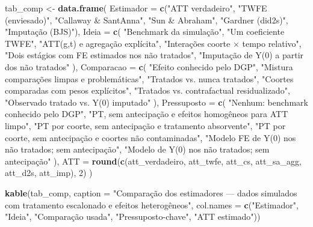 \documentclass[
]{article}
\newenvironment{Shaded}{\begin{snugshade}}{\end{snugshade}}
\newcommand{\AttributeTok}[1]{\textcolor[rgb]{0.13,0.29,0.53}{#1}}
\newcommand{\DecValTok}[1]{\textcolor[rgb]{0.00,0.00,0.81}{#1}}
\newcommand{\FunctionTok}[1]{\textcolor[rgb]{0.13,0.29,0.53}{\textbf{#1}}}
\newcommand{\NormalTok}[1]{#1}
\newcommand{\OtherTok}[1]{\textcolor[rgb]{0.56,0.35,0.01}{#1}}
\newcommand{\StringTok}[1]{\textcolor[rgb]{0.31,0.60,0.02}{#1}}
\begin{document}
\begin{Shaded}
\begin{Highlighting}[]
\NormalTok{tab\_comp }\OtherTok{\textless{}{-}} \FunctionTok{data.frame}\NormalTok{(}
  \AttributeTok{Estimador =} \FunctionTok{c}\NormalTok{(}\StringTok{"ATT verdadeiro"}\NormalTok{, }\StringTok{"TWFE (enviesado)"}\NormalTok{, }\StringTok{"Callaway \& Sant\textquotesingle{}Anna"}\NormalTok{,}
                \StringTok{"Sun \& Abraham"}\NormalTok{, }\StringTok{"Gardner (did2s)"}\NormalTok{, }\StringTok{"Imputação (BJS)"}\NormalTok{),}
  \AttributeTok{Ideia =} \FunctionTok{c}\NormalTok{(}
    \StringTok{"Benchmark da simulação"}\NormalTok{,}
    \StringTok{"Um coeficiente TWFE"}\NormalTok{,}
    \StringTok{"ATT(g,t) e agregação explícita"}\NormalTok{,}
    \StringTok{"Interações coorte × tempo relativo"}\NormalTok{,}
    \StringTok{"Dois estágios com FE estimados nos não tratados"}\NormalTok{,}
    \StringTok{"Imputação de Y(0) a partir dos não tratados"}
\NormalTok{  ),}
  \AttributeTok{Comparacao =} \FunctionTok{c}\NormalTok{(}
    \StringTok{"Efeito conhecido pelo DGP"}\NormalTok{,}
    \StringTok{"Mistura comparações limpas e problemáticas"}\NormalTok{,}
    \StringTok{"Tratados vs. nunca tratados"}\NormalTok{,}
    \StringTok{"Coortes comparadas com pesos explícitos"}\NormalTok{,}
    \StringTok{"Tratados vs. contrafactual residualizado"}\NormalTok{,}
    \StringTok{"Observado tratado vs. Y(0) imputado"}
\NormalTok{  ),}
  \AttributeTok{Pressuposto =} \FunctionTok{c}\NormalTok{(}
    \StringTok{"Nenhum: benchmark conhecido pelo DGP"}\NormalTok{,}
    \StringTok{"PT, sem antecipação e efeitos homogêneos para ATT limpo"}\NormalTok{,}
    \StringTok{"PT por coorte, sem antecipação e tratamento absorvente"}\NormalTok{,}
    \StringTok{"PT por coorte, sem antecipação e coortes não contaminadas"}\NormalTok{,}
    \StringTok{"Modelo FE de Y(0) nos não tratados; sem antecipação"}\NormalTok{,}
    \StringTok{"Modelo de Y(0) nos não tratados; sem antecipação"}
\NormalTok{  ),}
  \AttributeTok{ATT =} \FunctionTok{round}\NormalTok{(}\FunctionTok{c}\NormalTok{(att\_verdadeiro, att\_twfe, att\_cs, att\_sa\_agg, att\_d2s, att\_imp), }\DecValTok{2}\NormalTok{)}
\NormalTok{)}

\FunctionTok{kable}\NormalTok{(tab\_comp, }\AttributeTok{caption =} \StringTok{"Comparação dos estimadores — dados simulados com tratamento escalonado e efeitos heterogêneos"}\NormalTok{,}
      \AttributeTok{col.names =} \FunctionTok{c}\NormalTok{(}\StringTok{"Estimador"}\NormalTok{, }\StringTok{"Ideia"}\NormalTok{, }\StringTok{"Comparação usada"}\NormalTok{, }\StringTok{"Pressuposto{-}chave"}\NormalTok{, }\StringTok{"ATT estimado"}\NormalTok{))}
\end{Highlighting}
\end{Shaded}
\end{document}
